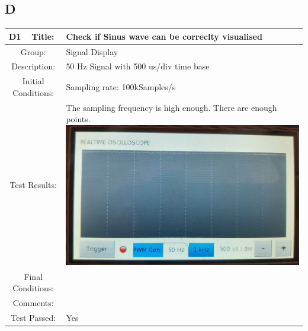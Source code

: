 \documentclass[12pt]{article}
\begin{document}
\subsection{D}
		\begin{table}[H]
	\begin{center}
		\begin{tabular}{| m{2cm}|m{2cm}|m{12cm}|}
			\hline 
			\bf D1&\bf Title:&\bf Check if Sinus wave can be correclty visualised\\ 
			\hline 
			\multicolumn{2}{|c|}{Group:}&Signal Display\\ 
			\hline 
			\multicolumn{2}{|c|}{Description:}&50 Hz Signal with 500 us/div time base\\ 
			\hline 
			\multicolumn{2}{|c|}{Initial Conditions:}&Sampling rate: 100kSamples/s\\ 
			\hline 
			\multicolumn{2}{|c|}{Test Results:}&The sampling frequency is high enough. There are enough points.
			\includegraphics[scale=0.08]{Ressources/PWM_500us}\\ 
			\hline 
			\multicolumn{2}{|c|}{Final Conditions:}&\\ 
			\hline 
			\multicolumn{2}{|c|}{Comments:}&\\ 
			\hline 
			\multicolumn{2}{|c|}{Test Passed:}&Yes \\ 
			\hline 
		\end{tabular} 
	\end{center}
\end{table}	
\end{document}
